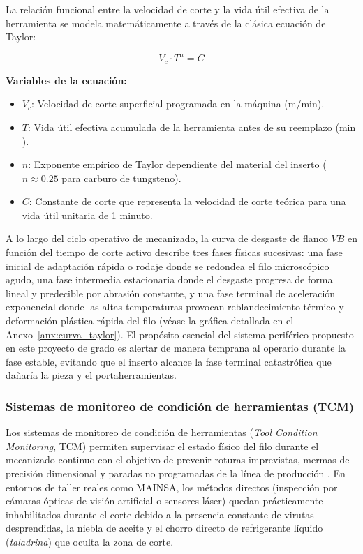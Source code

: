 La relación funcional entre la velocidad de corte y la vida útil efectiva de la herramienta se modela matemáticamente a través de la clásica ecuación de Taylor:

\begin{equation}
V_c \cdot T^n = C
\label{eq:taylor}
\end{equation}

\noindent\textbf{Variables de la ecuación:}
\begin{itemize}
    \item $V_c$: Velocidad de corte superficial programada en la máquina ($\text{m/min}$).
    \item $T$: Vida útil efectiva acumulada de la herramienta antes de su reemplazo ($\text{min}$).
    \item $n$: Exponente empírico de Taylor dependiente del material del inserto ($n \approx 0.25$ para carburo de tungsteno).
    \item $C$: Constante de corte que representa la velocidad de corte teórica para una vida útil unitaria de 1 minuto.
\end{itemize}

A lo largo del ciclo operativo de mecanizado, la curva de desgaste de flanco $VB$ en función del tiempo de corte activo describe tres fases físicas sucesivas: una fase inicial de adaptación rápida o rodaje donde se redondea el filo microscópico agudo, una fase intermedia estacionaria donde el desgaste progresa de forma lineal y predecible por abrasión constante, y una fase terminal de aceleración exponencial donde las altas temperaturas provocan reblandecimiento térmico y deformación plástica rápida del filo (véase la gráfica detallada en el Anexo~\ref{anx:curva_taylor}). El propósito esencial del sistema periférico propuesto en este proyecto de grado es alertar de manera temprana al operario durante la fase estable, evitando que el inserto alcance la fase terminal catastrófica que dañaría la pieza y el portaherramientas.

\subsubsection{Sistemas de monitoreo de condición de herramientas (TCM)}

Los sistemas de monitoreo de condición de herramientas (\textit{Tool Condition Monitoring}, TCM) permiten supervisar el estado físico del filo durante el mecanizado continuo con el objetivo de prevenir roturas imprevistas, mermas de precisión dimensional y paradas no programadas de la línea de producción \citep{byrne1995, teti2010}. En entornos de taller reales como MAINSA, los métodos directos (inspección por cámaras ópticas de visión artificial o sensores láser) quedan prácticamente inhabilitados durante el corte debido a la presencia constante de virutas desprendidas, la niebla de aceite y el chorro directo de refrigerante líquido (\textit{taladrina}) que oculta la zona de corte.

